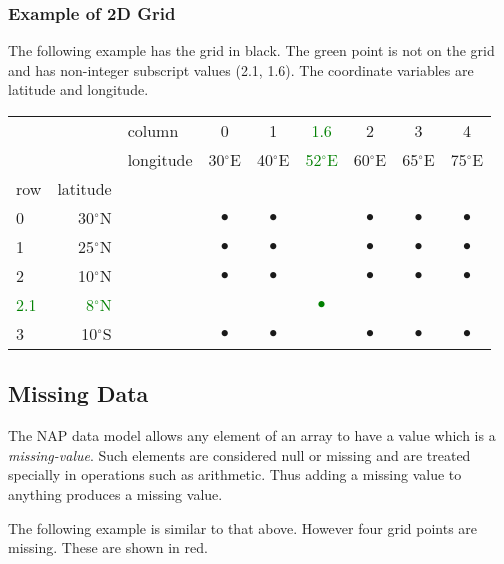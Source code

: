   \subsubsection{
    \label{ex2dgrid}Example of 2D Grid
  }

  \par The following example has the grid in black. The green point is not
  on the grid and has non-integer subscript values (2.1, 1.6). The
  coordinate variables are latitude and longitude.

    \begin{tabular}{|lrl|cccccc|}
      \hline 
         & 
         & 
        column & 
        0 & 
        1 & 
	\textcolor{green}{1.6}
         & 
        2 & 
        3 & 
        4
      \\
         & 
         & 
        longitude & 
        30$^{\circ}$E & 
        40$^{\circ}$E & 
	\textcolor{green}{52$^{\circ}$E}
         & 
        60$^{\circ}$E & 
        65$^{\circ}$E & 
        75$^{\circ}$E
      \\
        row & 
        latitude
         & 
         & 
         & 
         & 
         & 
         & 
         & 
      \\
      \hline 
        0 & 
        30$^{\circ}$N & 
         & 
        $\bullet$ & 
        $\bullet$ & 
         & 
        $\bullet$ & 
        $\bullet$ & 
        $\bullet$
      \\
        1 & 
        25$^{\circ}$N & 
         & 
        $\bullet$ & 
        $\bullet$ & 
         & 
        $\bullet$ & 
        $\bullet$ & 
        $\bullet$ 
      \\
        2 & 
        10$^{\circ}$N & 
         & 
        $\bullet$ & 
        $\bullet$ & 
         & 
        $\bullet$ & 
        $\bullet$ & 
        $\bullet$ 
      \\
	\textcolor{green}{2.1}
         & 
	\textcolor{green}{8$^{\circ}$N}
         & 
         & 
         & 
         & 
\textcolor{green}{$\bullet$}
         & 
         & 
         & 
      \\
        3 & 
        10$^{\circ}$S & 
         & 
        $\bullet$ & 
        $\bullet$ & 
         & 
        $\bullet$ & 
        $\bullet$ & 
        $\bullet$
      \\
      \hline 
\end{tabular}

  \subsection{
    \label{Missing}Missing Data
  }
The NAP data model allows any element of an array to have a
  value which is a 
  \textit{missing-value}. Such elements are considered null or missing
  and are treated specially in operations such as arithmetic. Thus
  adding a missing value to anything produces a missing value.
  \par The following example is similar to that above. However four grid
  points are missing. These are shown in red.


